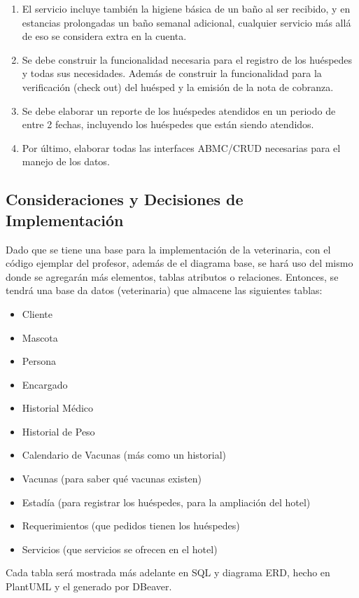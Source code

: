 \documentclass[
  12pt,
  hidelinks,
  a4paper,
  headings=standardclasses,
  headings=big,
  spanish
]{scrartcl}
\begin{document}
\begin{enumerate}
  \item El servicio incluye también la higiene básica de un baño al ser recibido, y en estancias prolongadas un baño semanal adicional, cualquier servicio más allá de eso se considera extra en la cuenta.
  \item Se debe construir la funcionalidad necesaria para el registro de los huéspedes y todas sus necesidades.
  Además de construir la funcionalidad para la verificación (check out) del huésped y la emisión de la nota de cobranza.
  \item Se debe elaborar un reporte de los huéspedes atendidos en un periodo de entre 2 fechas, incluyendo los huéspedes que están siendo atendidos.
  \item Por último, elaborar todas las interfaces ABMC/CRUD necesarias para el manejo de los datos.
\end{enumerate}

\subsection{Consideraciones y Decisiones de Implementación}

Dado que se tiene una base para la implementación de la veterinaria, con el código ejemplar del profesor, además de el diagrama base, se hará uso del mismo donde se agregarán más elementos, tablas atributos o relaciones.
Entonces, se tendrá una base da datos (veterinaria) que almacene las siguientes tablas:
\begin{itemize}
  \item Cliente
  \item Mascota
  \item Persona
  \item Encargado
  \item Historial Médico
  \item Historial de Peso
  \item Calendario de Vacunas (más como un historial)
  \item Vacunas (para saber qué vacunas existen)
  \item Estadía (para registrar los huéspedes, para la ampliación del hotel)
  \item Requerimientos (que pedidos tienen los huéspedes)
  \item Servicios (que servicios se ofrecen en el hotel)
\end{itemize}

Cada tabla será mostrada más adelante en SQL y diagrama ERD, hecho en PlantUML y el generado por DBeaver.
\end{document}
